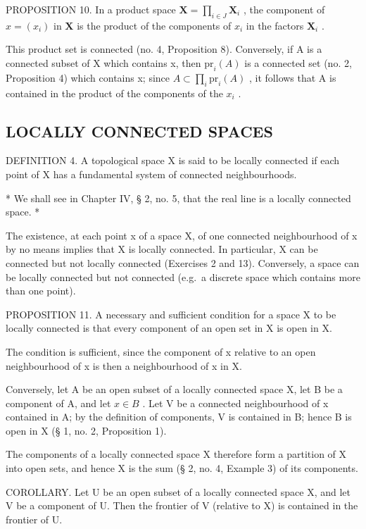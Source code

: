 PROPOSITION 10. In a product space \(\mathbf{X} = \prod_{i\in J}\mathbf{X}_i\) , the component of \(x = (x_i)\) in \(\mathbf{X}\) is the product of the components of \(x_i\) in the factors \(\mathbf{X}_i\) .

This product set is connected (no. 4, Proposition 8). Conversely, if A is a connected subset of X which contains x, then \(\mathrm{pr}_{i}(A)\) is a connected set (no. 2, Proposition 4) which contains x; since \(A \subset \prod_{i} \mathrm{pr}_{i}(A)\) , it follows that A is contained in the product of the components of the \(x_{i}\) .

\subsection{LOCALLY CONNECTED SPACES}

DEFINITION 4. A topological space X is said to be locally connected if each point of X has a fundamental system of connected neighbourhoods.

* We shall see in Chapter IV, § 2, no. 5, that the real line is a locally connected space. *

The existence, at each point x of a space X, of one connected neighbourhood of x by no means implies that X is locally connected. In particular, X can be connected but not locally connected (Exercises 2 and 13). Conversely, a space can be locally connected but not connected (e.g.~a discrete space which contains more than one point).

PROPOSITION 11. A necessary and sufficient condition for a space X to be locally connected is that every component of an open set in X is open in X.

The condition is sufficient, since the component of x relative to an open neighbourhood of x is then a neighbourhood of x in X.

Conversely, let A be an open subset of a locally connected space X, let B be a component of A, and let \(x \in B\) . Let V be a connected neighbourhood of x contained in A; by the definition of components, V is contained in B; hence B is open in X (§ 1, no. 2, Proposition 1).

The components of a locally connected space X therefore form a partition of X into open sets, and hence X is the sum (§ 2, no. 4, Example 3) of its components.

COROLLARY. Let U be an open subset of a locally connected space X, and let V be a component of U. Then the frontier of V (relative to X) is contained in the frontier of U.

